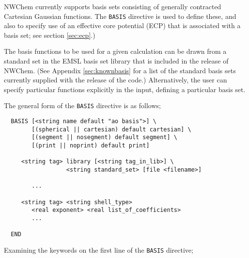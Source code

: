 \label{sec:basis} 

NWChem currently supports basis sets consisting of generally
contracted Cartesian Gaussian functions.  The {\tt BASIS} directive is
used to define these, and also to specify use of an effective core
potential (ECP) that is associated with a basis set; see section
\ref{sec:ecp}.)

The basis functions to be used for a given calculation can be drawn
from a standard set in the EMSL basis set library that is included in
the release of NWChem.  (See Appendix \ref{sec:knownbasis} for a list
of the standard basis sets currently supplied with the release of the
code.)  Alternatively, the user can specify particular functions
explicitly in the input, defining a particular basis set.

The general form of the \verb+BASIS+ directive is as follows;

\begin{verbatim}
  BASIS [<string name default "ao basis">] \
        [(spherical || cartesian) default cartesian] \
        [(segment || nosegment) default segment] \
        [(print || noprint) default print]

     <string tag> library [<string tag_in_lib>] \
                  <string standard_set> [file <filename>]

        ...

     <string tag> <string shell_type>
        <real exponent> <real list_of_coefficients>
        ...
     
  END
\end{verbatim}    

Examining the keywords on the first line of the \verb+BASIS+ directive;


